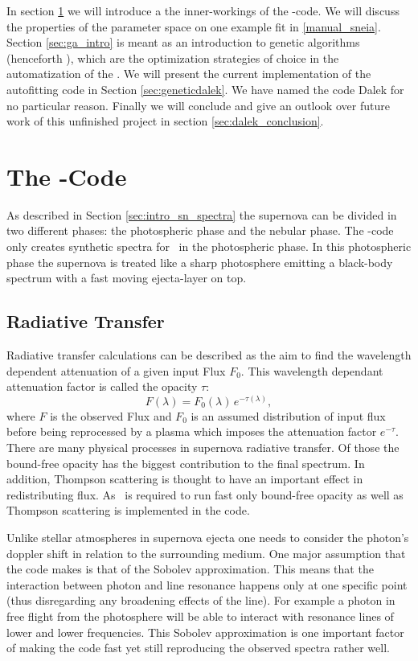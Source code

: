 In section \ref{sec:mlc_intro} we will introduce a the inner-workings of the \mlc-code.  We will discuss the properties of the parameter space on one example fit in \ref{manual_sneia}. Section \ref{sec:ga_intro} is meant as an introduction to genetic algorithms (henceforth \ga), which are the optimization strategies of choice in the automatization of the \mlc.  We will present the current implementation of the autofitting code in Section \ref{sec:geneticdalek}. We have named the code Dalek for no particular reason. Finally we will conclude and give an outlook over future work of this unfinished project in section \ref{sec:dalek_conclusion}.

\section{The \mlc-Code}
\label{sec:mlc_intro}
As described in Section \ref{sec:intro_sn_spectra} the supernova can be divided in two different phases: the photospheric phase and the nebular phase. The \mlc-code only creates synthetic spectra for \snia\ in the photospheric phase.
In this photospheric phase the supernova is treated like a sharp photosphere emitting a black-body spectrum with a fast moving ejecta-layer on top.

\subsection{Radiative Transfer}
Radiative transfer calculations can be described as the aim to find the wavelength dependent attenuation of a given input Flux $F_0$. This wavelength dependant attenuation factor is called the opacity $\tau$:
\[
	F(\lambda) = F_0(\lambda)\,e^{-\tau(\lambda)},
\]
where $F$ is the observed Flux and $F_0$ is an assumed distribution of input flux before being reprocessed by a plasma which imposes the attenuation factor $e^{-\tau}$.
There are many physical processes in supernova radiative transfer. Of those the bound-free opacity has the biggest contribution to the final spectrum. In addition, Thompson scattering is thought to have an important effect in redistributing flux. As \mlc\ is required to run fast only bound-free opacity as well as Thompson scattering is implemented in the code.

Unlike stellar atmospheres in supernova ejecta one needs to consider the photon's doppler shift in relation to the surrounding medium. One major assumption that the code makes is that of the Sobolev approximation.  This means that the interaction between photon and line resonance happens only at one specific point (thus disregarding any broadening effects of the line). For example a photon in free flight from the photosphere will be able to interact with resonance lines of lower and lower frequencies. This Sobolev approximation is one important factor of making the code fast yet still reproducing the observed spectra rather well.

